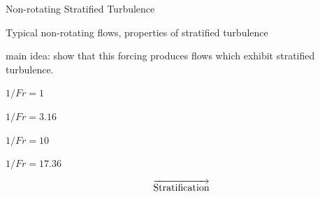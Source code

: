 \documentclass{beamer}
\begin{document}
\begin{frame}{Non-rotating Stratified Turbulence}
    \centering

    Typical non-rotating flows, properties of stratified turbulence

    main idea: show that this forcing produces flows which exhibit stratified
    turbulence. 

        \centering
        $1/Fr = 1$
        \vspace{2pt}
        
    \emp
    \hspace{1pt}
        \centering
        $1/Fr = 3.16$
        \vspace{2pt}
        
    \emp
    \hspace{1pt}
        \centering
        $1/Fr = 10$
        \vspace{2pt}
        
    \emp
    \hspace{1pt}
        \centering
        $1/Fr = 17.36$
        \vspace{2pt}
        
    \emp
    \[\overrightarrow{\rm Stratification}\]
\end{frame}
\end{document}
